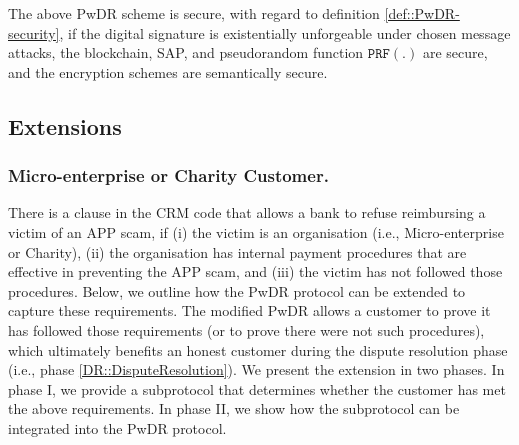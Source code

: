 %



\begin{theorem}\label{theorem::PwDR-security}
The above PwDR scheme is secure, with regard to definition \ref{def::PwDR-security}, if the digital signature is existentially unforgeable under chosen message attacks,  the blockchain, SAP, and pseudorandom function $\mathtt{PRF}(.)$ are secure, and the encryption schemes are semantically secure. 
\end{theorem}




\subsection{Extensions}

\subsubsection{Micro-enterprise or Charity Customer.} There is a clause in the CRM code that  allows a bank to refuse reimbursing a victim of an APP scam, if (i) the victim is an organisation (i.e., Micro-enterprise or Charity), (ii) the organisation has internal payment procedures that are effective in preventing the APP scam, and (iii) the victim has not followed those procedures. Below, we outline how the PwDR protocol can be extended to capture these requirements. The modified PwDR allows a customer to prove it has followed those requirements (or to prove there were not such  procedures), which ultimately benefits an honest customer during the dispute resolution phase (i.e., phase \ref{DR::DisputeResolution}).   We present the extension in two phases. In phase I, we provide a subprotocol that determines whether the customer has met the above requirements. In phase II, we show how the subprotocol can be integrated into the PwDR protocol.  

